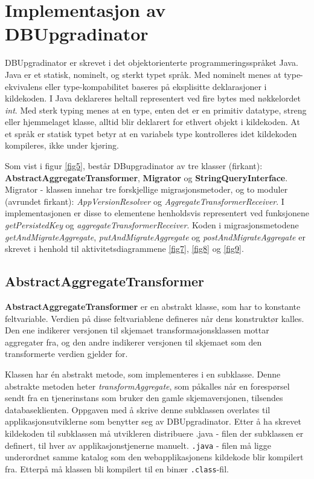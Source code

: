 \section{Implementasjon av DBUpgradinator}

DBUpgradinator er skrevet i det objektorienterte programmeringsspråket Java. Java er et statisk, nominelt, og sterkt typet språk. Med nominelt menes at type-ekvivalens eller type-kompabilitet baseres på eksplisitte deklarasjoner i kildekoden. I Java deklareres heltall representert ved fire bytes med nøkkelordet \emph{int}. Med sterk typing menes at en type, enten det er en primitiv datatype, streng eller hjemmelaget klasse, alltid blir deklarert for ethvert objekt i kildekoden. At et språk er statisk typet betyr at en variabels type kontrolleres idet kildekoden kompileres, ikke under kjøring.

Som vist i figur \ref{fig5}, består DBupgradinator av tre klasser (firkant): \textbf{AbstractAggregateTransformer}, \textbf{Migrator} og \textbf{StringQueryInterface}. Migrator - klassen innehar tre forskjellige migrasjonsmetoder, og to moduler (avrundet firkant): \emph{AppVersionResolver} og \emph{AggregateTransformerReceiver}. I implementasjonen er disse to elementene henholdsvis representert ved funksjonene \emph{getPersistedKey} og \emph{aggregateTransformerReceiver}. Koden i migrasjonsmetodene \emph{getAndMigrateAggregate}, \emph{putAndMigrateAggregate} og \emph{postAndMigrateAggregate} er skrevet i henhold til aktivitetsdiagrammene \ref{fig7}, \ref{fig8} og \ref{fig9}.

\subsection{AbstractAggregateTransformer}



\textbf{AbstractAggregateTransformer} er en abstrakt klasse, som har to konstante feltvariable. Verdien på disse feltvariablene defineres når dens konstruktør kalles. Den ene indikerer versjonen til skjemaet transformasjonsklassen mottar aggregater fra, og den andre indikerer versjonen til skjemaet som den transformerte verdien gjelder for.

Klassen har én abstrakt metode, som implementeres i en subklasse. Denne abstrakte metoden heter \emph{transformAggregate}, som påkalles når en forespørsel sendt fra en tjenerinstans som bruker den gamle skjemaversjonen, tilsendes databaseklienten. Oppgaven med å skrive denne subklassen overlates til applikasjonsutviklerne som benytter seg av DBUpgradinator. Etter å ha skrevet kildekoden til subklassen må utvikleren distribuere .java - filen der subklassen er definert, til hver av applikasjonstjenerne manuelt. \texttt{.java} - filen må ligge underordnet samme katalog som den webapplikasjonens kildekode blir kompilert fra. Etterpå må klassen bli kompilert til en binær \texttt{.class}-fil.

